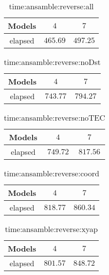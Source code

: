 \begin{table}[!ht]
	\centering
	\begin{tabular}{|c|c|c|}
		\hline
		Models & $4$ & $7$ \\ \hline
		elapsed & $465.69$ & $497.25$ \\ \hline
	\end{tabular}
	\caption{time:ansamble:reverse:all}
	\label{tab:time:ansamble:reverse:all}
\end{table}

\begin{table}[!ht]
	\centering
	\begin{tabular}{|c|c|c|}
		\hline
		Models & $4$ & $7$ \\ \hline
		elapsed & $743.77$ & $794.27$ \\ \hline
	\end{tabular}
	\caption{time:ansamble:reverse:noDst}
	\label{tab:time:ansamble:reverse:noDst}
\end{table}

\begin{table}[!ht]
	\centering
	\begin{tabular}{|c|c|c|}
		\hline
		Models & $4$ & $7$ \\ \hline
		elapsed & $749.72$ & $817.56$ \\ \hline
	\end{tabular}
	\caption{time:ansamble:reverse:noTEC}
	\label{tab:time:ansamble:reverse:noTEC}
\end{table}

\begin{table}[!ht]
	\centering
	\begin{tabular}{|c|c|c|}
		\hline
		Models & $4$ & $7$ \\ \hline
		elapsed & $818.77$ & $860.34$ \\ \hline
	\end{tabular}
	\caption{time:ansamble:reverse:coord}
	\label{tab:time:ansamble:reverse:coord}
\end{table}

\begin{table}[!ht]
	\centering
	\begin{tabular}{|c|c|c|}
		\hline
		Models & $4$ & $7$ \\ \hline
		elapsed & $801.57$ & $848.72$ \\ \hline
	\end{tabular}
	\caption{time:ansamble:reverse:xyap}
	\label{tab:time:ansamble:reverse:xyap}
\end{table}

